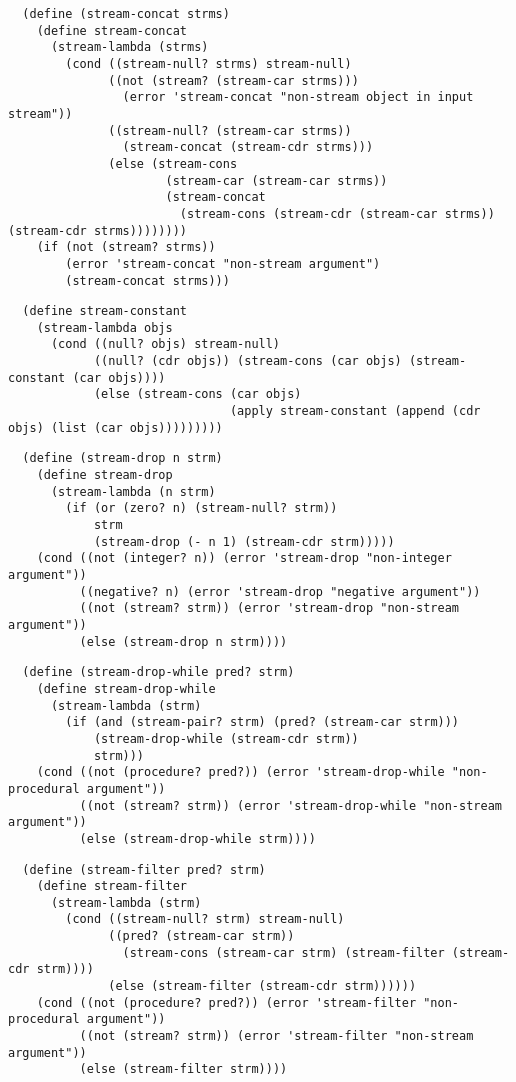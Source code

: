 \begin{verbatim}
  (define (stream-concat strms)
    (define stream-concat
      (stream-lambda (strms)
        (cond ((stream-null? strms) stream-null)
              ((not (stream? (stream-car strms)))
                (error 'stream-concat "non-stream object in input stream"))
              ((stream-null? (stream-car strms))
                (stream-concat (stream-cdr strms)))
              (else (stream-cons
                      (stream-car (stream-car strms))
                      (stream-concat
                        (stream-cons (stream-cdr (stream-car strms)) (stream-cdr strms))))))))
    (if (not (stream? strms))
        (error 'stream-concat "non-stream argument")
        (stream-concat strms)))
\end{verbatim}

\begin{verbatim}
  (define stream-constant
    (stream-lambda objs
      (cond ((null? objs) stream-null)
            ((null? (cdr objs)) (stream-cons (car objs) (stream-constant (car objs))))
            (else (stream-cons (car objs)
                               (apply stream-constant (append (cdr objs) (list (car objs)))))))))
\end{verbatim}

\begin{verbatim}
  (define (stream-drop n strm)
    (define stream-drop
      (stream-lambda (n strm)
        (if (or (zero? n) (stream-null? strm))
            strm
            (stream-drop (- n 1) (stream-cdr strm)))))
    (cond ((not (integer? n)) (error 'stream-drop "non-integer argument"))
          ((negative? n) (error 'stream-drop "negative argument"))
          ((not (stream? strm)) (error 'stream-drop "non-stream argument"))
          (else (stream-drop n strm))))
\end{verbatim}

\begin{verbatim}
  (define (stream-drop-while pred? strm)
    (define stream-drop-while
      (stream-lambda (strm)
        (if (and (stream-pair? strm) (pred? (stream-car strm)))
            (stream-drop-while (stream-cdr strm))
            strm)))
    (cond ((not (procedure? pred?)) (error 'stream-drop-while "non-procedural argument"))
          ((not (stream? strm)) (error 'stream-drop-while "non-stream argument"))
          (else (stream-drop-while strm))))
\end{verbatim}

\begin{verbatim}
  (define (stream-filter pred? strm)
    (define stream-filter
      (stream-lambda (strm)
        (cond ((stream-null? strm) stream-null)
              ((pred? (stream-car strm))
                (stream-cons (stream-car strm) (stream-filter (stream-cdr strm))))
              (else (stream-filter (stream-cdr strm))))))
    (cond ((not (procedure? pred?)) (error 'stream-filter "non-procedural argument"))
          ((not (stream? strm)) (error 'stream-filter "non-stream argument"))
          (else (stream-filter strm))))
\end{verbatim}

